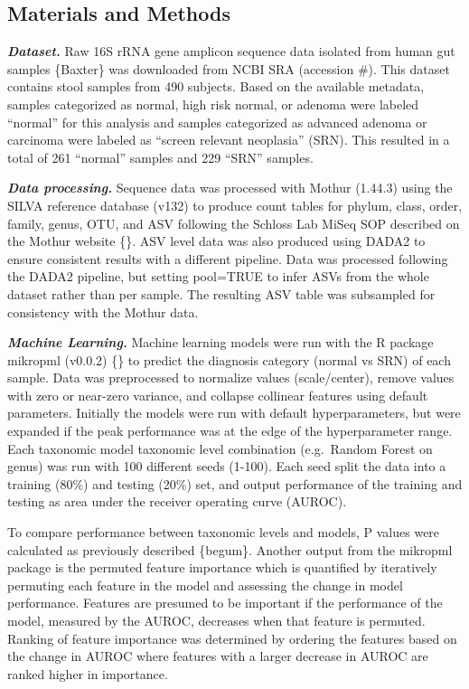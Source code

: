 \documentclass[
]{article}
\begin{document}
\hypertarget{materials-and-methods}{%
\subsection{Materials and Methods}\label{materials-and-methods}}

\textbf{\emph{Dataset.}} Raw 16S rRNA gene amplicon sequence data
isolated from human gut samples \{Baxter\} was downloaded from NCBI SRA
(accession \#). This dataset contains stool samples from 490 subjects.
Based on the available metadata, samples categorized as normal, high
risk normal, or adenoma were labeled ``normal'' for this analysis and
samples categorized as advanced adenoma or carcinoma were labeled as
``screen relevant neoplasia'' (SRN). This resulted in a total of 261
``normal'' samples and 229 ``SRN'' samples.

\textbf{\emph{Data processing.}} Sequence data was processed with Mothur
(1.44.3) using the SILVA reference database (v132) to produce count
tables for phylum, class, order, family, genus, OTU, and ASV following
the Schloss Lab MiSeq SOP described on the Mothur website \{\}. ASV
level data was also produced using DADA2 to ensure consistent results
with a different pipeline. Data was processed following the DADA2
pipeline, but setting pool=TRUE to infer ASVs from the whole dataset
rather than per sample. The resulting ASV table was subsampled for
consistency with the Mothur data.

\textbf{\emph{Machine Learning.}} Machine learning models were run with
the R package mikropml (v0.0.2) \{\} to predict the diagnosis category
(normal vs SRN) of each sample. Data was preprocessed to normalize
values (scale/center), remove values with zero or near-zero variance,
and collapse collinear features using default parameters. Initially the
models were run with default hyperparameters, but were expanded if the
peak performance was at the edge of the hyperparameter range. Each
taxonomic model taxonomic level combination (e.g.~Random Forest on
genus) was run with 100 different seeds (1-100). Each seed split the
data into a training (80\%) and testing (20\%) set, and output
performance of the training and testing as area under the receiver
operating curve (AUROC).

To compare performance between taxonomic levels and models, P values
were calculated as previously described \{begum\}. Another output from
the mikropml package is the permuted feature importance which is
quantified by iteratively permuting each feature in the model and
assessing the change in model performance. Features are presumed to be
important if the performance of the model, measured by the AUROC,
decreases when that feature is permuted. Ranking of feature importance
was determined by ordering the features based on the change in AUROC
where features with a larger decrease in AUROC are ranked higher in
importance.
\end{document}
